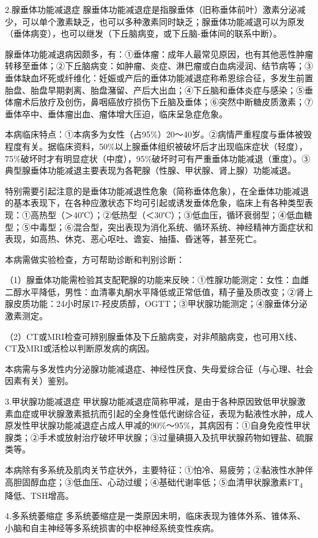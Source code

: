 2.腺垂体功能减退症
腺垂体功能减退症是指腺垂体（旧称垂体前叶）激素分泌减少，可以单个激素缺乏，也可以多种激素同时缺乏；腺垂体功能减退可以为原发（垂体病变），也可以继发（下丘脑病变，或下丘脑-垂体间的联系中断）。

腺垂体功能减退病因颇多，有：①垂体瘤：成年人最常见原因，也有其他恶性肿瘤转移至垂体；②下丘脑病变：如肿瘤、炎症、淋巴瘤或白血病浸润、结节病等；③垂体缺血坏死或纤维化：妊娠或产后的垂体功能减退症称希恩综合征，多发生前置胎盘、胎盘早期剥离、胎盘潴留、产后大出血；④下丘脑和垂体炎症与感染；⑤垂体瘤术后放疗及创伤，鼻咽癌放疗损伤下丘脑及垂体；⑥突然中断糖皮质激素；⑦垂体卒中、垂体瘤出血、瘤体增大压迫，临床呈急症危象。

本病临床特点：①本病多为女性（占95\%）20～40岁。②病情严重程度与垂体被毁程度有关。据临床资料，50\%以上腺垂体组织被破坏后才出现临床症状（轻度），75\%破坏时才有明显症状（中度），95\%破坏时可有严重垂体功能减退（重度）。③典型腺垂体功能减退主要表现为各靶腺（性腺、甲状腺、肾上腺）功能减退。

特别需要引起注意的是垂体功能减退性危象（简称垂体危象），在全垂体功能减退的基本表现下，在各种应激状态下均可引起或诱发垂体危象，临床上有各种类型表现：①高热型（＞40℃）；②低热型（＜30℃）；③低血压，循环衰弱型；④低血糖型；⑤中毒型；⑥混合型，突出表现为消化系统、循环系统、神经精神方面症状和表现，如高热、休克、恶心呕吐、谵妄、抽搐、昏迷等，甚至死亡。

本病需做实验检查，方可帮助诊断和判别诊断：

（1）腺垂体功能需检验其支配靶腺的功能来反映：①性腺功能测定：女性：血雌二醇水平降低，男性：血清睾丸酮水平降低或正常低值，精子量及质改变；②肾上腺皮质功能：24小时尿17-羟皮质醇，OGTT；③甲状腺功能测定；④腺垂体分泌激素测定。

（2）CT或MRI检查可辨别腺垂体及下丘脑病变，对非颅脑病变，也可用X线、CT及MRI或活检以判断原发病的病因。

本病需与多发性内分泌腺功能减退症、神经性厌食、失母爱综合征（与心理、社会因素有关）鉴别。

3.甲状腺功能减退症
甲状腺功能减退症简称甲减，是由于各种原因致低甲状腺激素血症或甲状腺激素抵抗而引起的全身性低代谢综合征，表现为黏液性水肿，成人原发性甲状腺功能减退症占成人甲减的90\%～95\%，其病因有：①自身免疫性甲状腺类；②手术或放射治疗破坏甲状腺；③过量碘摄入及抗甲状腺药物如锂盐、硫脲类等。

本病除有多系统及肌肉关节症状外，主要特征：①怕冷、易疲劳；②黏液性水肿伴高胆固醇血症；③低血压、心动过缓；④基础代谢率低；⑤血清甲状腺激素FT\textsubscript{4}
降低、TSH增高。

4.多系统萎缩症
多系统萎缩症是一类原因未明，临床表现为锥体外系、锥体系、小脑和自主神经等多系统损害的中枢神经系统变性疾病。

